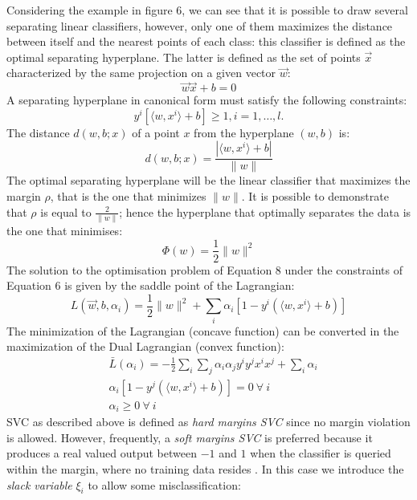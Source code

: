 \documentclass[nocrop]{bioinfo}
\begin{document}
\begin{methods}
Considering the example in figure 6, we can see that it is possible to draw several separating linear classifiers, however, only one of them maximizes the distance between itself and the nearest points of each class: this classifier is defined as the optimal separating hyperplane. The latter is defined as the set of points $\Vec{x}$ characterized by the same projection on a given vector $\Vec{w}$:
\begin{equation}
    \Vec{w} \Vec{x}+b=0
\end{equation}
A separating hyperplane in canonical form must satisfy the following constraints:
\begin{equation}
    y^i[\langle w, x^i \rangle  + b] \geq 1,  i = 1,\dots,l.
\end{equation}
The distance $d(w,b;x)$ of a point $x$ from the hyperplane $(w, b)$ is:
\begin{equation}
    d(w,b;x) = \frac{|\langle w, x^i \rangle + b|}{\|w\|}
\end{equation}
The optimal separating hyperplane will be the linear classifier that maximizes the margin $\rho$, that is the one that minimizes $\|w\|$. It is possible to demonstrate that $\rho$ is equal to $\frac{2}{\|w\|}$; hence the hyperplane that optimally separates the data is the one that minimises:
\begin{equation}
    \Phi(w)= \frac{1}{2} \|w\|^2
\end{equation}
The solution to the optimisation problem of Equation 8 under the constraints of Equation 6 is given by the saddle point of the Lagrangian:
\begin{equation}
    L(\vec{w},b,\alpha_i) = \frac{1}{2}\|w\|^2 + \sum_i \alpha_i [1-y^i(\langle w, x^i \rangle+b)]
\end{equation}
The minimization of the Lagrangian (concave function) can be converted in the maximization of the Dual Lagrangian (convex function):
\begin{equation}
    \begin{split}
        &\bar{L}(\alpha_i) = -\frac{1}{2}\sum_i \sum_j \alpha_i \alpha_j y^i y^j x^i x^j + \sum_i \alpha_i \\
		&\alpha_i [1-y^j(\langle w, x^i \rangle+b)]=0 \ \forall \ i  \\
		&\alpha_i \geq 0 \ \forall \ i
    \end{split}
\end{equation}
SVC as described above is defined as \textit{hard margins SVC} since no margin violation is allowed. However, frequently, a \textit{soft margins SVC} is preferred because it produces a real valued output between ${-1}$ and $1$ when the classifier is queried within the margin, where no training data resides \citep{gunn1998support}. In this case we introduce the \textit{slack variable} $\xi_i$ to allow some misclassification:

\end{methods}
\end{document}
